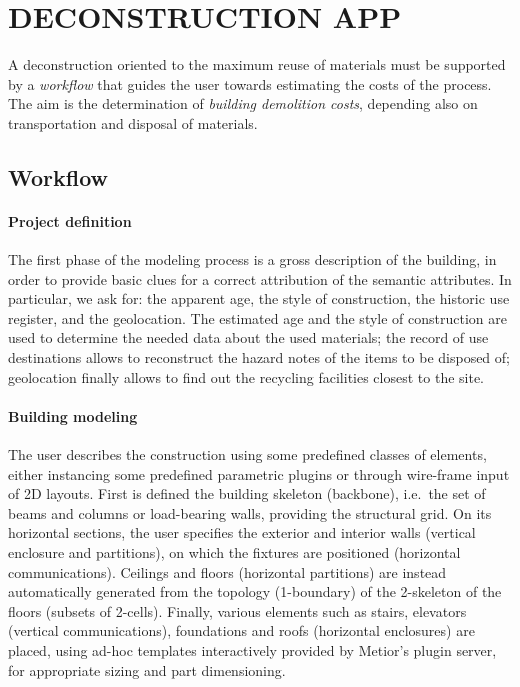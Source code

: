 \documentclass[a4paper,twoside]{article}
\begin{document}
%
\section{\uppercase{Deconstruction App}}
\label{sec:application}

\noindent
A deconstruction oriented to the maximum reuse of materials must be supported by a \emph{workflow} that guides the user towards estimating the costs of the process. The aim is the determination of  \emph{building demolition costs}, depending also on transportation  and disposal of materials.

\subsection{Workflow}

\paragraph{Project definition} 

\noindent
The first phase of the modeling process is a gross description of the building, in order to provide basic clues for a correct attribution of the semantic attributes.
In particular, we ask for: the apparent age, the style of construction, the historic use register, and the geolocation.
The estimated age and the style of construction are used to determine the needed data about the used materials; the record of use destinations allows to reconstruct the hazard notes of the items to be disposed of; geolocation finally allows to find out the recycling facilities closest to the site.

\paragraph{Building modeling} 

\noindent
The user describes the construction using some predefined classes of elements, either instancing some  predefined parametric plugins or through wire-frame input of 2D layouts. 
First is defined the building skeleton (backbone), i.e.~the set of beams and columns or load-bearing walls, providing the structural grid.
On its horizontal sections, the user specifies the exterior and interior walls (vertical enclosure and partitions), on which the fixtures are positioned (horizontal communications).
Ceilings and floors (horizontal partitions) are instead automatically generated from the topology (1-boundary) of the 2-skeleton of the floors (subsets of 2-cells).
Finally, various elements such as stairs, elevators (vertical communications), foundations and roofs (horizontal enclosures) are placed, using ad-hoc templates interactively provided by Metior's plugin server, for appropriate sizing and part dimensioning.
\end{document}
